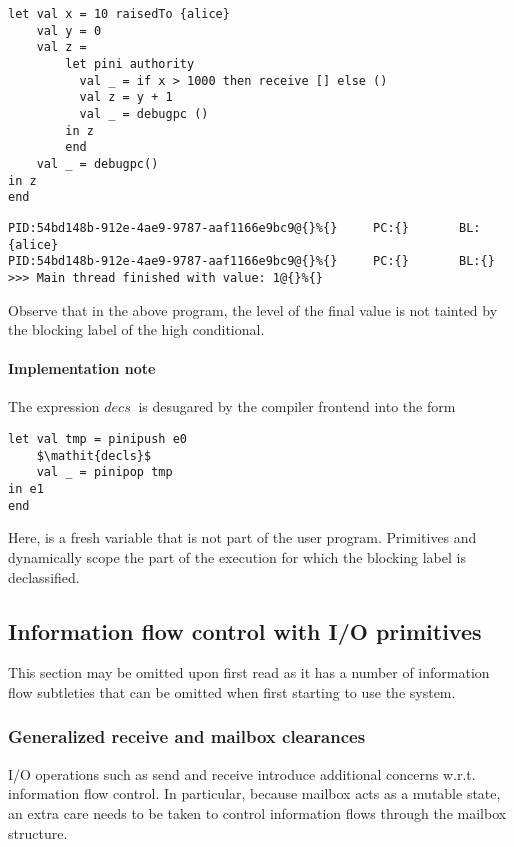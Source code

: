 \begin{lstlisting}
let val x = 10 raisedTo {alice}
    val y = 0
    val z = 
        let pini authority
          val _ = if x > 1000 then receive [] else ()
          val z = y + 1
          val _ = debugpc () 
        in z
        end
    val _ = debugpc()
in z
end
\end{lstlisting}

\begin{verbatim}
PID:54bd148b-912e-4ae9-9787-aaf1166e9bc9@{}%{}     PC:{}       BL:{alice}           
PID:54bd148b-912e-4ae9-9787-aaf1166e9bc9@{}%{}     PC:{}       BL:{}            
>>> Main thread finished with value: 1@{}%{}
\end{verbatim}
Observe that in the above program, the level of the final value 
is not tainted by the blocking label of the high conditional. 


\paragraph{Implementation note}
The expression  $\mathit{decs}\ $ is desugared by the compiler frontend into the form 
\begin{lstlisting}
let val tmp = pinipush e0 
    $\mathit{decls}$
    val _ = pinipop tmp
in e1      
end
\end{lstlisting}
Here,  is a fresh variable that is not part of the user program. Primitives  and 
 dynamically scope the part of the execution for which the blocking label is declassified.


\subsection{Information flow control with I/O primitives}
This section may be omitted upon first read as it has a number of information flow subtleties that 
can be omitted when first starting to use the system.
\subsubsection{Generalized receive and mailbox clearances}

I/O operations such as send and receive introduce additional concerns w.r.t. 
information flow control. In particular, because mailbox acts as a mutable state, an extra
care needs to be taken to control information flows through the mailbox structure.


